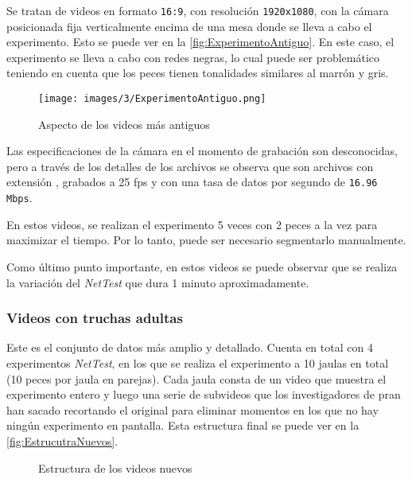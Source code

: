 Se tratan de videos en formato \texttt{16:9}, con resolución \texttt{1920x1080}, con la cámara posicionada fija verticalmente encima de una mesa donde se lleva a cabo el experimento. Esto se puede ver 
en la \autoref{fig:ExperimentoAntiguo}. En este caso, el experimento se lleva a cabo con redes negras, lo cual puede ser problemático teniendo en cuenta que los peces tienen 
tonalidades similares al marrón y gris.

\begin{figure}[h]
    \centering
    \texttt{[image: images/3/ExperimentoAntiguo.png]}
    \caption{Aspecto de los videos más antiguos}
    \label{fig:ExperimentoAntiguo}
\end{figure}

Las especificaciones de la cámara en el momento de grabación son desconocidas, pero a través de los detalles de los archivos se observa que son archivos con extensión 
\texttt{}, grabados a 25 \acrshort{fps} y con una tasa de datos por segundo de \texttt{16.96 Mbps}.

En estos videos, se realizan el experimento 5 veces con 2 peces a la vez para maximizar el tiempo. Por lo tanto, puede ser necesario segmentarlo manualmente.

Como último punto importante, en estos videos se puede observar que se realiza la variación del \textit{NetTest} que dura 1 minuto aproximadamente.

\subsubsection*{Videos con truchas adultas}

Este es el conjunto de datos más amplio y detallado. Cuenta en total con 4 experimentos \textit{NetTest}, en los que se realiza el experimento a 10 jaulas en total (10 peces por jaula en parejas). 
Cada jaula consta de un  video que muestra el experimento entero y luego una serie de subvideos que los investigadores de \acrshort{pran} han sacado recortando el original para eliminar 
momentos en los que no hay ningún experimento en pantalla. Esta estructura final se puede ver en la \autoref{fig:EstrucutraNuevos}.

\begin{figure}[h]
    \centering
    \begin{subfigure}[b]{0.5\textwidth}
    \end{subfigure}
    \caption{Estructura de los  videos nuevos}
    \label{fig:EstrucutraNuevos}
\end{figure}

